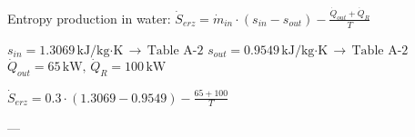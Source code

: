 Entropy production in water:  
\( \dot{S}_{erz} = \dot{m}_{in} \cdot (s_{in} - s_{out}) - \frac{\dot{Q}_{out} + \dot{Q}_R}{T} \)  

\( s_{in} = 1.3069 \, \text{kJ/kg·K} \, \rightarrow \, \text{Table A-2} \)  
\( s_{out} = 0.9549 \, \text{kJ/kg·K} \, \rightarrow \, \text{Table A-2} \)  
\( \dot{Q}_{out} = 65 \, \text{kW}, \, \dot{Q}_R = 100 \, \text{kW} \)  

\( \dot{S}_{erz} = 0.3 \cdot (1.3069 - 0.9549) - \frac{65 + 100}{T} \)  

---